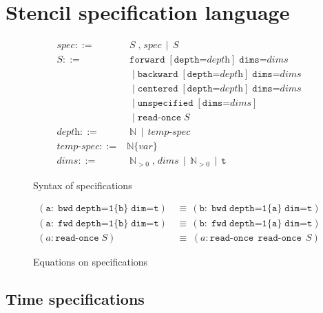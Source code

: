 \documentclass[10pt]{sigplanconf}
\theoremstyle{definition}
\begin{document}
\section{Stencil specification language}
\label{sec:lang}

\begin{figure}
\begin{align*}
spec ::= & \; S  \; \texttt{,} \; spec \, \mid \, S \\[0.5em]
%
S ::= &  \; \texttt{forward} \; [\texttt{depth=}\textit{depth}] \; \texttt{dims=}\textit{dims} \\
& \; \mid \texttt{backward} \; [\texttt{depth=}\textit{depth}] \; \texttt{dims=}\textit{dims} \\
& \; \mid \texttt{centered} \; [\texttt{depth=}\textit{depth}] \; \texttt{dims=}\textit{dims} \\
& \; \mid \texttt{unspecified} \; [\texttt{dims=}\textit{dims}] \\
& \; \mid \texttt{read-once} \; S \\[0.5em]
\textit{depth} ::= & \; \mathbb{N} \, \mid \, \textit{temp-spec} \\ 
\textit{temp-spec} ::= & \mathbb{N}\{var\} \\
\textit{dims}  ::= & \;\mathbb{N}_{>0} \; \texttt{,} \; \textit{dims} \,
                      \mid \, \mathbb{N}_{>0} \, \mid \, 
                     \texttt{t}
\end{align*}
\caption{Syntax of specifications}
\end{figure}

\begin{figure}
\begin{align*}
(\texttt{a} : \; \texttt{bwd} \; \texttt{depth=1\{b\}} \;
  \texttt{dim=t})
\, & \equiv \,
(\texttt{b} : \; \texttt{bwd} \; \texttt{depth=1\{a\}} \;
  \texttt{dim=t})
\\ 
(\texttt{a} : \; \texttt{fwd} \; \texttt{depth=1\{b\}} \;
  \texttt{dim=t})
\, & \equiv \,
(\texttt{b} : \; \texttt{fwd} \; \texttt{depth=1\{a\}} \;
  \texttt{dim=t})
\\
(a : \texttt{read-once} \; S) \; & \equiv \; (a : \texttt{read-once} \;\,
  \texttt{read-once} \; \, S)
\end{align*}
\caption{Equations on specifications}
\end{figure}

\subsection{Time specifications}
\end{document}

